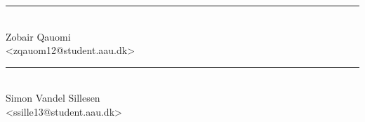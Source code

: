 \noindent
\begin{minipage}[b]{0.45\textwidth}
 \centering
 \rule{\textwidth}{0.5pt}\\
 Zobair Qauomi\\
 {\footnotesize <zqauom12@student.aau.dk>}
\end{minipage}
%
\hfill
%
\begin{minipage}[b]{0.45\textwidth}
 \centering
 \rule{\textwidth}{0.5pt}\\
  Simon Vandel Sillesen\\
 {\footnotesize <ssille13@student.aau.dk>}
\end{minipage}
\vspace{3\baselineskip}
